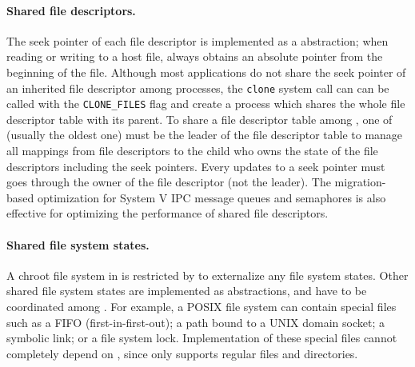 \paragraph{Shared file descriptors.}
The seek pointer of each file descriptor is implemented as a \libos{} abstraction;
when reading or writing to a host file,
\thehostabi{} always obtains an absolute pointer from the beginning of the file.
Although most applications
do not share the seek pointer of an inherited file descriptor among processes,
the {\tt clone} system call
can can be called with the {\tt CLONE\_FILES} flag
and create a process
which shares the whole file descriptor table with its parent.
To share a file descriptor table among \picoprocs{},
one of \picoprocs{} (usually the oldest one)
must be the leader of the file descriptor table to manage all mappings
from file descriptors to the child \picoproc{} who owns the state of the file descriptors including the seek pointers.
Every updates to a seek pointer must goes through the owner of the file descriptor (not the leader).
The migration-based optimization for System V IPC message queues and semaphores is also effective for optimizing the performance of shared file descriptors. 

\paragraph{Shared file system states.}
A chroot file system in \thelibos{}
is restricted by \thehostabi{} to externalize any file system states.
Other shared file system states are implemented as \libos{} abstractions, and have to be coordinated among \picoprocs{}.
For example, a POSIX file system can contain special files such as a FIFO (first-in-first-out); a path bound to a UNIX domain socket;
a symbolic link; or a file system lock.
Implementation of these special files cannot
completely depend on \thehostabi{},
since \thehostabi{} only supports regular files and directories.

